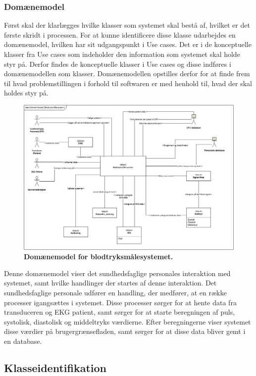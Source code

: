 \subsubsection{Domænemodel}
Først skal der klarlægges hvilke klasser som systemet skal bestå af, hvilket er det første skridt i processen. For at kunne identificere disse klasse udarbejdes en domænemodel, hvilken har sit udgangspunkt i Use cases. Det er i de konceptuelle klasser fra Use cases som indeholder den information som systemet skal holde styr på. Derfor findes de konceptuelle klasser i Use cases og disse indføres i domænemodellen som klasser. Domænemodellen opstilles derfor for at finde frem til hvad problemstillingen i forhold til softwaren er med henhold til, hvad der skal holdes styr på.
\begin{figure}[H]
\includegraphics[width =1.0\textwidth , center]{billeder/DM}
\caption{\textbf{Domænemodel for blodtryksmålesystemet.}}
\end{figure}
Denne domænemodel viser det sundhedsfaglige personales interaktion med systemet, samt hvilke handlinger der startes af denne interaktion. Det sundhedsfaglige personale udfører en handling, der medfører, at en række processer igangsættes i systemet. Disse processer sørger for at hente data fra transduceren og EKG patient, samt sørger for at starte beregningen af puls, systolisk, diastolisk og middeltryks værdierne. Efter beregningerne viser systemet disse værdier på brugergrænsefladen, samt sørger for at disse data bliver gemt i en database.
\newpage
\subsection{Klasseidentifikation}
